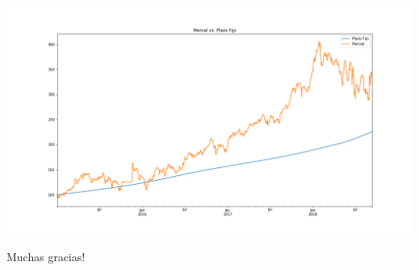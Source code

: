 \documentclass[12pt,aspectratio=169]{beamer}
\begin{document}
\begin{frame}
\centering
\includegraphics[height=.9\paperheight]{plazofijovsmerval.png}
\end{frame}

\begin{frame}
	\centering
	\huge Muchas gracias!
\end{frame}
\end{document}
